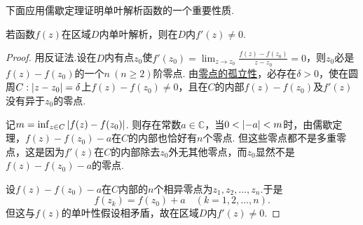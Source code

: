 下面应用儒歇定理证明单叶解析函数的一个重要性质.
\begin{theorem}%
若函数\(f(z)\)在区域\(D\)内单叶解析，则在\(D\)内\(f'(z)\neq0\).
\begin{proof}
用反证法.设在\(D\)内有点\(z_0\)使\(f'(z_0)=\lim_{z \to z_0} \frac{f(z)-f(z_0)}{z-z_0}=0\)，则\(z_0\)必是\(f(z)-f(z_0)\)的一个\(n\ (n\geq2)\)阶零点.
由\hyperref[theorem:解析函数的级数表示.解析函数的零点的孤立性]{零点的孤立性}，必存在\(\delta>0\)，使在圆周\(C: \abs{z-z_0}=\delta\)上\(f(z)-f(z_0)\neq0\)，且在\(C\)的内部\(f(z)-f(z_0)\)及\(f'(z)\)没有异于\(z_0\)的零点.

记\(m = \inf_{z \in C} \abs{f(z) - f(z_0)}\).
则存在常数\(a\in\mathbb{C}\)，当\(0<\abs{-a}<m\)时，由儒歇定理，\(f(z)-f(z_0)-a\)在\(C\)的内部也恰好有\(n\)个零点.
但这些零点都不是多重零点，这是因为\(f'(z)\)在\(C\)的内部除去\(z_0\)外无其他零点，而\(z_0\)显然不是\(f(z)-f(z_0)-a\)的零点.

设\(f(z)-f(z_0)-a\)在\(C\)内部的\(n\)个相异零点为\(z_1,z_2,\dotsc,z_n\).于是\[
f(z_k) = f(z_0) + a \quad(k=1,2,\dotsc,n).
\]但这与\(f(z)\)的单叶性假设相矛盾，故在区域\(D\)内\(f'(z)\neq0\).
\end{proof}
\end{theorem}





